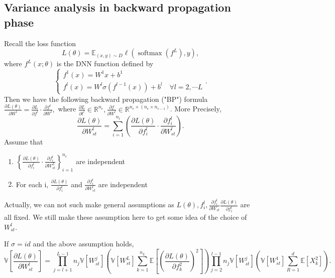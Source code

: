 \subsection{Variance analysis in backward propagation phase}
Recall the loss function
$$
L(\theta)=\mathbb{E}_{(x, y) \sim D} \ell \left(\operatorname{softmax}\left(f^{L}\right), y\right),
$$
where $ f^{L}(x; \theta) $  is the DNN function defined by 
$$
\left\{\begin{array}{l}f^{1}(x)=W^{1} x+b^{1} \\ f^{l}(x)=W^{l} \sigma\left(f^{l-1}(x)\right)+b^{l} \quad \forall l=2, \cdots L\end{array}\right. .
$$
Then we have the following backward propagation ("BP") formula
$
\frac{\partial L(\theta)}{\partial W^{l}}=\frac{\partial L}{\partial f^{l}} \cdot \frac{\partial f^{l}}{\partial W^{l}},
$
where 
$\frac{\partial L}{\partial t^{l}} \in \mathbb{R}^{n_e}, \frac{\partial f}{\partial W^{l}} \in \mathbb{R}^{n_{e} \times\left(n_{e} \times n_{e-1}\right)}$. More Precisely,
$$
\frac{\partial L(\theta)}{\partial W_{s t}^{l}}=\sum\limits_{i=1}^{n_{l}}\left(\frac{\partial L(\theta)}{\partial f_{i}^{l}} \cdot \frac{\partial f_{i}^{l}}{\partial W_{s t}^{l}}\right).
$$
Assume that
\begin{enumerate}
\item $\left\{\frac{\partial L(\theta)}{\partial f_{i}^{l}} \cdot \frac{\partial f_{i}^{l}}{\partial W_{s t}^{L}}\right\}_{i=1}^{n_{e}}$ are independent
\item For each i,   $ \frac{\partial L(\theta)}{\partial f_{i}^{l}}  $ and $\frac{\partial f_{i}^{l}}{\partial W_{s t}^{l}}$ are independent 
\end{enumerate}
Actually, we can not such make general assumptions as $L(\theta), f_{i}^{l}, \frac{\partial f_{i}^{l}}{\partial W_{st}} \frac{\partial L(\theta)}{\partial f_{i}^{l}}$   are all fixed. We still make these assumption here to get some idea of the choice of $W_{s t}^{l}$. 
\begin{lemma}\label{th:idnormal2}
If $\sigma =id$ and  the above assumption holds,
$$\mathbb{V}\left[\frac{\partial L (\theta)}{\partial W_{s t}^{l}}\right] = \prod\limits_{j=l+1}^{L-1} n_{j} \mathbb{V}\left[W_{s t}^{j}\right] \left(\mathbb{V}\left[W_{s t}^{L}\right]\sum\limits_{k=1}^{n_{L}} \mathbb{E}\left[\left(\frac{\partial L(\theta)}{\partial f_{k}^{2}}\right)^{2}\right]\right) 
\prod\limits_{j=2}^{l-1} n_{j} \mathbb{V}\left[W_{s t}^{j}\right] \left(\mathbb{V}\left[W_{s t}^{1}\right]\sum\limits_{R=1}^{d} \mathbb{E}\left[ X_{k}^{2}\right]\right).
$$
\end{lemma}
